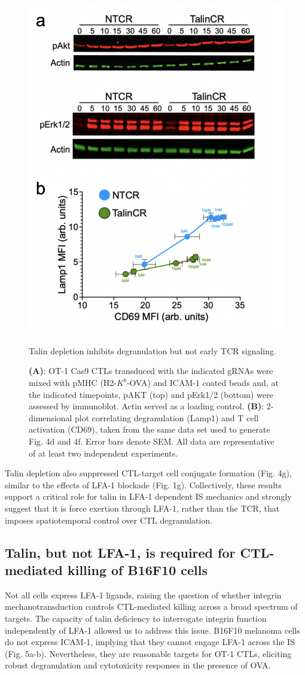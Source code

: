\begin{figure}[htbp]
	\centering
	\includegraphics[width=0.8\columnwidth]{../figures/chapter3/fig4activation.png}
	\caption{Talin depletion inhibits degranulation but not early TCR signaling.}
	\caption*{\textbf{(A)}: OT-1 Cas9 CTLs transduced with the indicated gRNAs were mixed with pMHC (H2-$K^{b}$-OVA) and ICAM-1 coated beads and, at the indicated timepoints, pAKT (top) and pErk1/2 (bottom) were assessed by immunoblot. Actin served as a loading control. \textbf{(B)}: 2-dimensional plot correlating degranulation (Lamp1) and T cell activation (CD69), taken from the same data set used to generate Fig. 4d and 4f. Error bars denote SEM. All data are representative of at least two independent experiments.}
	\label{fig:fig4activation}
\end{figure} 

Talin depletion also suppressed CTL-target cell conjugate formation (Fig. 4g), similar to the effects of LFA-1 blockade (Fig. 1g). Collectively, these results support a critical role for talin in LFA-1 dependent IS mechanics and strongly suggest that it is force exertion through LFA-1, rather than the TCR, that imposes spatiotemporal control over CTL degranulation.

\subsection{Talin, but not LFA-1, is required for CTL-mediated killing of B16F10 cells}
Not all cells express LFA-1 ligands, raising the question of whether integrin mechanotransduction controls CTL-mediated killing across a broad spectrum of targets. The capacity of talin deficiency to interrogate integrin function independently of LFA-1 allowed us to address this issue. B16F10 melanoma cells do not express ICAM-1, implying that they cannot engage LFA-1 across the IS (Fig. 5a-b). Nevertheless, they are reasonable targets for OT-1 CTLs, eliciting robust degranulation and cytotoxicity responses in the presence of OVA. 

